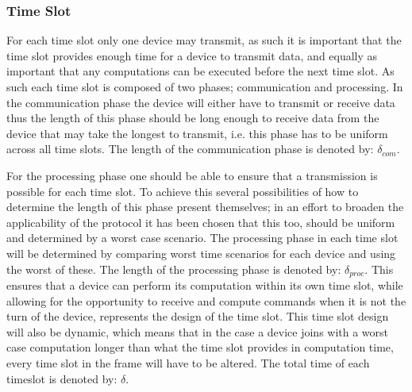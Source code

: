 \subsubsection*{Time Slot}
For each time slot only one device may transmit, as such it is important that the time slot provides enough time for a device to transmit data, and equally as important that any computations can be executed before the next time slot.
As such each time slot is composed of two phases; communication and processing.
In the communication phase the device will either have to transmit or receive data thus the length of this phase should be long enough to receive data from the device that may take the longest to transmit, i.e. this phase has to be uniform across all time slots.
The length of the communication phase is denoted by: $\delta_{com}$.

\bigskip \noindent
For the processing phase one should be able to ensure that a transmission is possible for each time slot.
To achieve this several possibilities of how to determine the length of this phase present themselves; in an effort to broaden the applicability of the protocol it has been chosen that this too, should be uniform and determined by a worst case scenario.
The processing phase in each time slot will be determined by comparing worst time scenarios for each device and using the worst of these.
The length of the processing phase is denoted by: $\delta_{proc}$.
This ensures that a device can perform its computation within its own time slot, while allowing for the opportunity to receive and compute commands when it is not the turn of the device,  represents the design of the time slot.
This time slot design will also be dynamic, which means that in the case a device joins with a worst case computation longer than what the time slot provides in computation time, every time slot in the frame will have to be altered.
The total time of each timeslot is denoted by: $\delta$.

